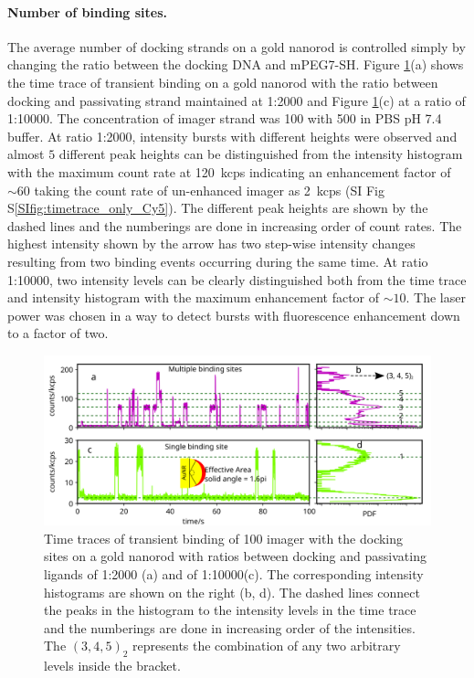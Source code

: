 \paragraph*{Number of binding sites.} The average number of docking strands on a gold nanorod is controlled simply by changing the ratio between the docking DNA and mPEG7-SH.
Figure \ref{fig:timetrace1vsmany}(a) shows the time trace of transient binding on a gold nanorod with the ratio between docking and passivating strand maintained at 1:2000 and Figure \ref{fig:timetrace1vsmany}(c) at a ratio of 1:10000.
The concentration of imager strand was \SI{100}{\nM} with \SI{500}{\mM}  in PBS pH 7.4 buffer.
At ratio 1:2000, intensity bursts with different heights were observed and almost $5$ different peak heights can be distinguished from the intensity histogram with the maximum count rate at \SI{120}{ kcps} indicating an enhancement factor of $\sim60$ taking the count rate of un-enhanced imager as \SI{2} { kcps} (SI Fig S\ref{SIfig:timetrace_only_Cy5}).
The different peak heights are shown by the dashed lines and the numberings are done in increasing order of count rates.
The highest intensity shown by the arrow has two step-wise intensity changes resulting from two binding events occurring during the same time.
At ratio 1:10000, two intensity levels can be clearly distinguished both from the time trace and intensity histogram with the maximum enhancement factor of $\sim10$.
The laser power was chosen in a way to detect bursts with fluorescence enhancement down to a factor of two.
\begin{figure}[ht]
	\centering
	\includegraphics[width=\textwidth]{timetrace1vsmany}%
	\caption{Time traces of transient binding of \SI{100}{\nM} imager with the docking sites on a gold nanorod with ratios between docking and passivating ligands of 1:2000 (a) and of 1:10000(c).
	The corresponding intensity histograms are shown on the right (b, d).
	The dashed lines connect the peaks in the histogram to the intensity levels in the time trace and the numberings are done in increasing order of the intensities.
	The $(3, 4, 5)_2$ represents the combination of any two arbitrary levels inside the bracket. 
	}
  	\label{fig:timetrace1vsmany}
\end{figure}

